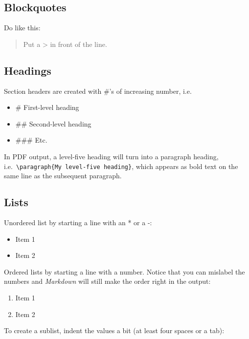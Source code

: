 \documentclass[a4paper, nobind]{templates/ociamthesis}
\providecommand{\tightlist}{%
  \setlength{\itemsep}{0pt}\setlength{\parskip}{0pt}}
\begin{document}
\subsection{Blockquotes}\label{blockquotes}

Do like this:

\begin{quote}
Put a \textgreater{} in front of the line.
\end{quote}

\subsection{Headings}\label{headings}

Section headers are created with \#'s of increasing number, i.e.~

\begin{itemize}
\tightlist
\item
  \# First-level heading
\item
  \#\# Second-level heading
\item
  \#\#\# Etc.
\end{itemize}

In PDF output, a level-five heading will turn into a paragraph heading, i.e.~\texttt{\textbackslash{}paragraph\{My\ level-five\ heading\}}, which appears as bold text on the same line as the subsequent paragraph.

\subsection{Lists}\label{lists}

Unordered list by starting a line with an * or a -:

\begin{itemize}
\tightlist
\item
  Item 1
\item
  Item 2
\end{itemize}

Ordered lists by starting a line with a number.
Notice that you can mislabel the numbers and \emph{Markdown} will still make the order right in the output:

\begin{enumerate}
\def\labelenumi{\arabic{enumi}.}
\tightlist
\item
  Item 1
\item
  Item 2
\end{enumerate}

To create a sublist, indent the values a bit (at least four spaces or a tab):
\end{document}
